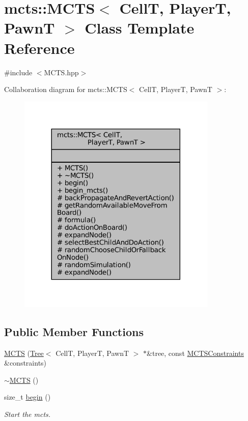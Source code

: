 \hypertarget{classmcts_1_1_m_c_t_s}{}\section{mcts\+:\+:M\+C\+TS$<$ CellT, PlayerT, PawnT $>$ Class Template Reference}
\label{classmcts_1_1_m_c_t_s}


{\ttfamily \#include $<$M\+C\+T\+S.\+hpp$>$}



Collaboration diagram for mcts\+:\+:M\+C\+TS$<$ CellT, PlayerT, PawnT $>$\+:
\nopagebreak
\begin{figure}[H]
\begin{center}
\leavevmode
\includegraphics[width=269pt]{classmcts_1_1_m_c_t_s__coll__graph}
\end{center}
\end{figure}
\subsection*{Public Member Functions}
\begin{DoxyCompactItemize}
\item 
\hyperlink{classmcts_1_1_m_c_t_s_afa6deaf4737e68bee60a9bbd0d8178d2}{M\+C\+TS} (\hyperlink{classmcts_1_1_tree}{Tree}$<$ CellT, PlayerT, PawnT $>$ $\ast$\&tree, const \hyperlink{structmcts_1_1_m_c_t_s_constraints}{M\+C\+T\+S\+Constraints} \&constraints)
\item 
\hyperlink{classmcts_1_1_m_c_t_s_a8b88bfdafadbfe716dd10cd464e56e61}{$\sim$\+M\+C\+TS} ()
\item 
size\+\_\+t \hyperlink{classmcts_1_1_m_c_t_s_ae8b2818e7a34e858e9dd284d33bca874}{begin} ()
\begin{DoxyCompactList}\small\item\em Start the mcts. \end{DoxyCompactList}\end{DoxyCompactItemize}
